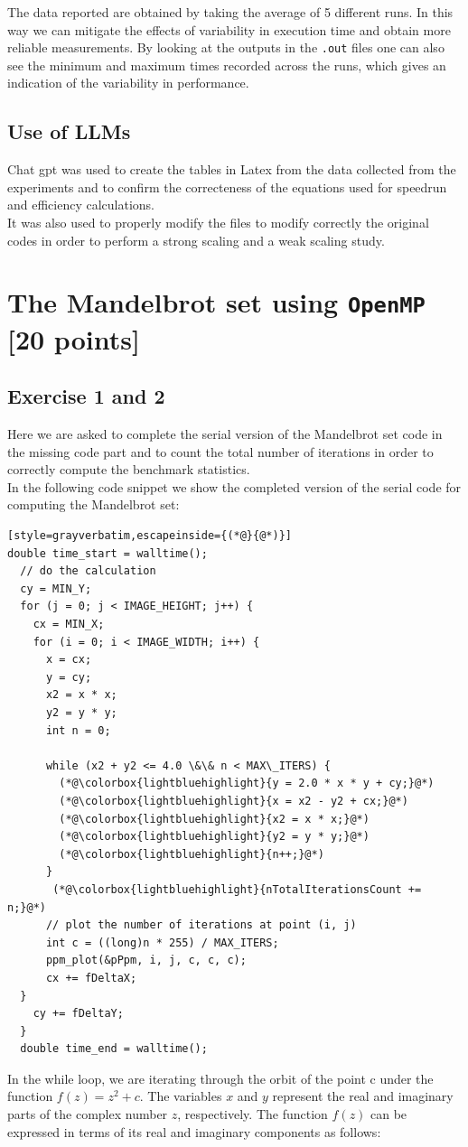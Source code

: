 \documentclass[unicode,10pt,a4paper,oneside,numbers=endperiod,openany]{scrartcl}
\begin{document}
The data reported are obtained by taking the average of 5 different runs. In this way we can mitigate the effects of variability in execution time and obtain more reliable measurements. By looking at the outputs in the \texttt{.out} files one can also see the minimum and maximum times recorded across the runs, which gives an indication of the variability in performance.
\subsection{Use of LLMs}
Chat gpt was used to create the tables in Latex from the data collected from the experiments and to confirm the correcteness of the equations used for speedrun and efficiency calculations.\\
It was also used to properly modify the  files to modify correctly the original codes in order to perform a strong scaling and a weak scaling study.
\newpage
\section{The Mandelbrot set  using \texttt{OpenMP} [20 points]}
\subsection{Exercise 1 and 2}
Here we are asked to complete the serial version of the Mandelbrot set code in the missing code part and to count the total number of iterations in order to correctly compute the benchmark statistics.\\
In the following code snippet we show the completed version of the serial code for computing the Mandelbrot set:
\begin{lstlisting}[style=grayverbatim,escapeinside={(*@}{@*)}]
double time_start = walltime();
  // do the calculation
  cy = MIN_Y;
  for (j = 0; j < IMAGE_HEIGHT; j++) {
    cx = MIN_X;
    for (i = 0; i < IMAGE_WIDTH; i++) {
      x = cx;
      y = cy;
      x2 = x * x;
      y2 = y * y;
      int n = 0;
      
      while (x2 + y2 <= 4.0 \&\& n < MAX\_ITERS) { 
        (*@\colorbox{lightbluehighlight}{y = 2.0 * x * y + cy;}@*)
        (*@\colorbox{lightbluehighlight}{x = x2 - y2 + cx;}@*)
        (*@\colorbox{lightbluehighlight}{x2 = x * x;}@*)
        (*@\colorbox{lightbluehighlight}{y2 = y * y;}@*)
        (*@\colorbox{lightbluehighlight}{n++;}@*)
      }
       (*@\colorbox{lightbluehighlight}{nTotalIterationsCount += n;}@*)
      // plot the number of iterations at point (i, j)
      int c = ((long)n * 255) / MAX_ITERS;
      ppm_plot(&pPpm, i, j, c, c, c);
      cx += fDeltaX;
  }
    cy += fDeltaY;
  }
  double time_end = walltime();
\end{lstlisting}
In the while loop, we are iterating through the orbit of the point c under the function $f(z) = z^2 + c$. The variables $x$ and $y$ represent the real and imaginary parts of the complex number $z$, respectively. The function $f(z)$ can be expressed in terms of its real and imaginary components as follows:
\end{document}
